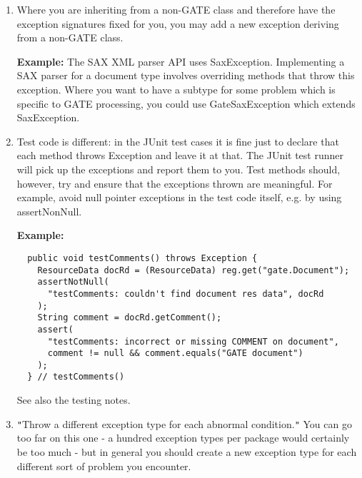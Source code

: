 \begin{enumerate}
{\bf Example:}\newline
If a method is creating annotations on a document, and before creating the
annotations it checks that their start and end points are valid ranges in
relation to the content of the document (i.e. they fall within the offset space
of the document, and the end is after the start), then if the method receives an
InvalidOffsetException from the AnnotationSet.add call, something is seriously
wrong. In such cases it may be best to throw a GateRuntimeException.

\item 
Where you are inheriting from a non-GATE class and therefore have the exception
signatures fixed for you, you may add a new exception deriving from a non-GATE
class.\newline

{\bf Example:}\newline
The SAX XML parser API uses SaxException. Implementing a SAX parser for a
document type involves overriding methods that throw this exception. Where you
want to have a subtype for some problem which is specific to GATE processing,
you could use GateSaxException which extends SaxException.

\item 
Test code is different: in the JUnit test cases it is fine just to declare that
each method throws Exception and leave it at that. The JUnit test runner will
pick up the exceptions and report them to you. Test methods should, however,
try and ensure that the exceptions thrown are meaningful. For example, avoid
null pointer exceptions in the test code itself, e.g. by using assertNonNull.\newline

{\bf Example:}
\begin{lstlisting}  
  public void testComments() throws Exception { 
    ResourceData docRd = (ResourceData) reg.get("gate.Document"); 
    assertNotNull(
      "testComments: couldn't find document res data", docRd
    ); 
    String comment = docRd.getComment(); 
    assert( 
      "testComments: incorrect or missing COMMENT on document", 
      comment != null && comment.equals("GATE document") 
    ); 
  } // testComments() 
\end{lstlisting}

See also the testing notes.

\item 
{\tt{}"{}}Throw a different exception type for each abnormal condition.{\tt{}"{}} You can go too
far on this one - a hundred exception types per package would certainly be too
much - but in general you should create a new exception type for each different
sort of problem you encounter.\newline


\end{enumerate}
